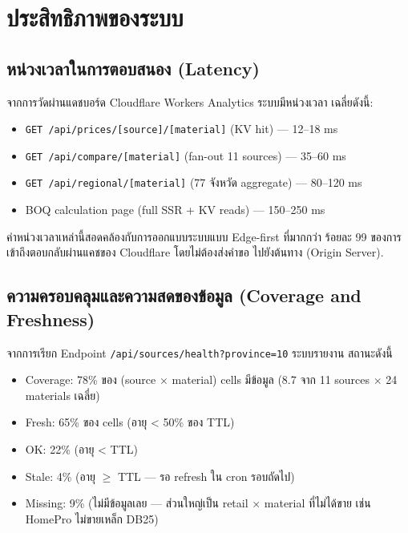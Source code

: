 


\section{ประสิทธิภาพของระบบ}
\label{sec:perf}

\subsection{หน่วงเวลาในการตอบสนอง (Latency)}

จากการวัดผ่านแดชบอร์ด Cloudflare Workers Analytics ระบบมีหน่วงเวลา
เฉลี่ยดังนี้:

\begin{itemize}[leftmargin=2em,itemsep=0.1em]
  \item \texttt{GET /api/prices/[source]/[material]} (KV hit) — 12--18 ms
  \item \texttt{GET /api/compare/[material]} (fan-out 11 sources) — 35--60 ms
  \item \texttt{GET /api/regional/[material]} (77 จังหวัด aggregate) — 80--120 ms
  \item BOQ calculation page (full SSR + KV reads) — 150--250 ms
\end{itemize}

ค่าหน่วงเวลาเหล่านี้สอดคล้องกับการออกแบบระบบแบบ Edge-first ที่มากกว่า
ร้อยละ 99 ของการเข้าถึงตอบกลับผ่านแคชของ Cloudflare โดยไม่ต้องส่งคำขอ
ไปยังต้นทาง (Origin Server).

\subsection{ความครอบคลุมและความสดของข้อมูล (Coverage and Freshness)}

จากการเรียก Endpoint \texttt{/api/sources/health?province=10} ระบบรายงาน
สถานะดังนี้
\begin{itemize}[leftmargin=2em,itemsep=0.1em]
  \item Coverage: 78\% ของ (source $\times$ material) cells มีข้อมูล
        (8.7 จาก 11 sources $\times$ 24 materials เฉลี่ย)
  \item Fresh: 65\% ของ cells (อายุ < 50\% ของ TTL)
  \item OK: 22\% (อายุ < TTL)
  \item Stale: 4\% (อายุ $\geq$ TTL — รอ refresh ใน cron รอบถัดไป)
  \item Missing: 9\% (ไม่มีข้อมูลเลย — ส่วนใหญ่เป็น retail × material
        ที่ไม่ได้ขาย เช่น HomePro ไม่ขายเหล็ก DB25)
\end{itemize}
